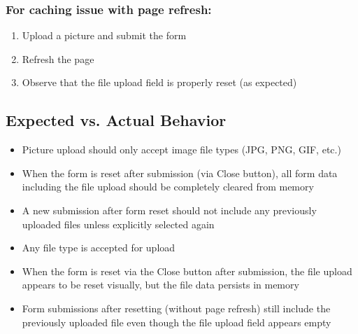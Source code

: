 \subsubsection*{For caching issue with page refresh:}
\begin{enumerate}
    \item Upload a picture and submit the form
    \item Refresh the page
    \item Observe that the file upload field is properly reset (as expected)
\end{enumerate}

\subsection*{Expected vs. Actual Behavior}
\begin{tcolorbox}[colback=gray!10, colframe=gray!40, title=Expected Behavior]
\begin{itemize}
    \item Picture upload should only accept image file types (JPG, PNG, GIF, etc.)
    \item When the form is reset after submission (via Close button), all form data including the file upload should be completely cleared from memory
    \item A new submission after form reset should not include any previously uploaded files unless explicitly selected again
\end{itemize}
\end{tcolorbox}

\begin{tcolorbox}[colback=gray!10, colframe=gray!40, title=Actual Behavior]
\begin{itemize}
    \item Any file type is accepted for upload
    \item When the form is reset via the Close button after submission, the file upload appears to be reset visually, but the file data persists in memory
    \item Form submissions after resetting (without page refresh) still include the previously uploaded file even though the file upload field appears empty
\end{itemize}
\end{tcolorbox}

